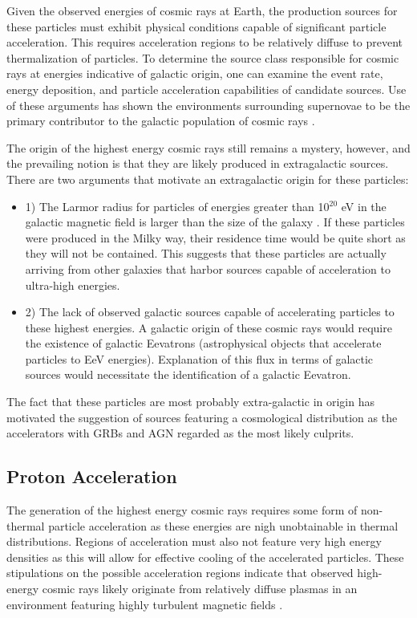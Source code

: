 \documentclass{gatech-thesis}
\begin{document}
Given the observed energies of cosmic rays at Earth, the production sources for these particles must exhibit physical conditions capable of significant particle acceleration. This requires acceleration regions to be relatively diffuse to prevent thermalization of particles. To determine the source class responsible for cosmic rays at energies indicative of galactic origin, one can examine the event rate, energy deposition, and particle acceleration capabilities of candidate sources. Use of these arguments has shown the environments surrounding supernovae to be the primary contributor to the galactic population of cosmic rays \cite{Ackermann15022013}. 

The origin of the highest energy cosmic rays still remains a mystery, however, and the prevailing notion is that they are likely produced in extragalactic sources. There are two arguments that motivate an extragalactic origin for these particles:
\begin{itemize}
\item 1) The Larmor radius for particles of energies greater than 10$^{20}$ eV in the galactic magnetic field is larger than the size of the galaxy \cite{1984ARA&A..22..425H}. If these particles were produced in the Milky way, their residence time would be quite short as they will not be contained. This suggests that these particles are actually arriving from other galaxies that harbor sources capable of acceleration to ultra-high energies.
\item 2) The lack of observed galactic sources capable of accelerating particles to these highest energies. A galactic origin of these cosmic rays would require the existence of galactic Eevatrons (astrophysical objects that accelerate particles to EeV energies). Explanation of this flux in terms of galactic sources would necessitate the identification of a galactic Eevatron.
\end{itemize}
The fact that these particles are most probably extra-galactic in origin has motivated the suggestion of sources featuring a cosmological distribution as the accelerators with GRBs and AGN regarded as the most likely culprits.

\subsection{Proton Acceleration}
The generation of the highest energy cosmic rays requires some form of non-thermal particle acceleration as these energies are nigh unobtainable in thermal distributions. Regions of acceleration must also not feature very high energy densities as this will allow for effective cooling of the accelerated particles. These stipulations on the possible acceleration regions indicate that observed high-energy cosmic rays likely originate from relatively diffuse plasmas in an environment featuring highly turbulent magnetic fields \cite{1984ARA&A..22..425H}.
\end{document}
